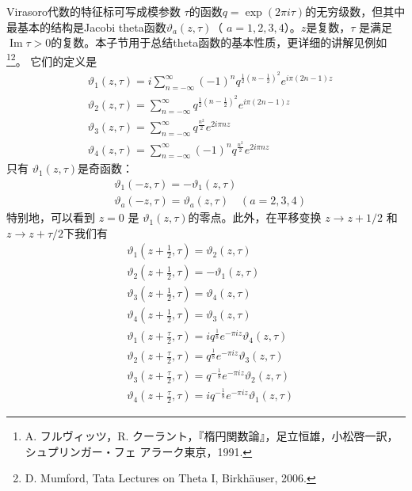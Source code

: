 Virasoro代数的特征标可写成模参数 $\tau $的函数$ q=\exp (2 \pi i \tau) $的无穷级数，但其中最基本的结构是Jacobi theta函数$ \vartheta_{a}(z, \tau) $（ $a=1,2,3,4 $）。$ z$是复数，$ \tau$ 是满足$ \operatorname{Im} \tau>0 $的复数。本子节用于总结theta函数的基本性质，更详细的讲解见例如\footnote{A. フルヴィッツ，R. クーラント，『楕円関数論』，足立恒雄，小松啓一訳，シュプリンガー・フェ アラーク東京，1991.}\footnote{D. Mumford, Tata Lectures on Theta I, Birkhäuser, 2006.}。
它们的定义是
\begin{align} &\vartheta_{1}(z, \tau)=i \sum_{n=-\infty}^{\infty}(-1)^{n} q^{\frac{1}{2}\left(n-\frac{1}{2}\right)^{2}} e^{i \pi(2 n-1) z} \\ &\vartheta_{2}(z, \tau)=\sum_{n=-\infty}^{\infty} q^{\frac{1}{2}\left(n-\frac{1}{2}\right)^{2}} e^{i \pi(2 n-1) z} \\ &\vartheta_{3}(z, \tau)=\sum_{n=-\infty}^{\infty} q^{\frac{n^{2}}{2}} e^{2 i \pi n z} \\ &\vartheta_{4}(z, \tau)=\sum_{n=-\infty}^{\infty}(-1)^{n} q^{\frac{n^{2}}{2}} e^{2 i \pi n z} \end{align}
只有 $\vartheta_{1}(z, \tau) $是奇函数：
\begin{align} &\vartheta_{1}(-z, \tau)=-\vartheta_{1}(z, \tau) \\ &\vartheta_{a}(-z, \tau)=\vartheta_{a}(z, \tau) \quad(a=2,3,4) \end{align}
特别地，可以看到 $z=0$ 是 $\vartheta_{1}(z, \tau) $的零点。此外，在平移变换 $z \rightarrow z+1/2$ 和 $z \rightarrow z+ \tau/2 $下我们有
\begin{align} &\vartheta_{1}\left(z+\frac{1}{2}, \tau\right)=\vartheta_{2}(z, \tau)\\ &\vartheta_{2}\left(z+\frac{1}{2}, \tau\right)=-\vartheta_{1}(z, \tau)\\ &\vartheta_{3}\left(z+\frac{1}{2}, \tau\right)=\vartheta_{4}(z, \tau)\\ &\vartheta_{4}\left(z+\frac{1}{2}, \tau\right)=\vartheta_{3}(z, \tau) \\ &\vartheta_{1}\left(z+\frac{\tau}{2}, \tau\right)=i q^{\frac{1}{8}} e^{-\pi i z} \vartheta_{4}(z, \tau)\\ &\vartheta_{2}\left(z+\frac{\tau}{2}, \tau\right)=q^{\frac{1}{8}} e^{-\pi i z} \vartheta_{3}(z, \tau)\\ &\vartheta_{3}\left(z+\frac{\tau}{2}, \tau\right)=q^{-\frac{1}{8}} e^{-\pi i z} \vartheta_{2}(z, \tau)\\ &\vartheta_{4}\left(z+\frac{\tau}{2}, \tau\right)=i q^{-\frac{1}{8}} e^{-\pi i z} \vartheta_{1}(z, \tau)  \end{align}
